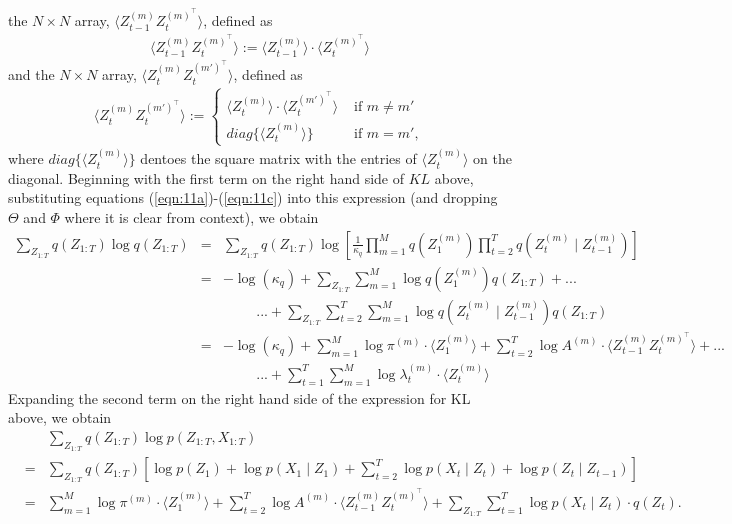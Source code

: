 \documentclass{amsart}
\begin{document}
the $N\times N$ array, $\langle 
Z_{t-1}^{(m)}Z_t^{(m)^\intercal}\rangle$,
defined as  
\begin{eqnarray*}
\langle Z_{t-1}^{(m)}Z_t^{(m)^\intercal}\rangle :=\langle Z_{t-1}^{(m)}\rangle\cdot\langle Z_t^{(m)^\intercal}\rangle 
\end{eqnarray*}
and the $N\times N$ array, $\langle 
Z_{t}^{(m)}Z_t^{(m')^\intercal}\rangle$,
defined as
\begin{eqnarray*}
\langle Z_{t}^{(m)}Z_t^{(m')^\intercal}\rangle := \begin{cases}
\langle Z_t^{(m)}\rangle\cdot\langle Z_t^{(m')^\intercal}\rangle & \text{ 
if }m\neq m'\\
diag\{\langle Z_t^{(m)}\rangle\} & \text{ if }m=m',
\end{cases}
\end{eqnarray*}
where $diag\{\langle Z_t^{(m)}\rangle\}$ dentoes the square matrix with 
the entries of $\langle Z_t^{(m)}\rangle$ on the diagonal.
Beginning with the first term on the right hand side of $KL$ above, substituting equations 
(\ref{eqn:11a})-(\ref{eqn:11c}) into this 
expression (and dropping $\Theta$ and $\Phi$ where it is clear from 
context), we obtain 
\begin{eqnarray*}
\sum_{Z_{1:T}}q(Z_{1:T})\log q(Z_{1:T}) 
& = & \sum_{Z_{1:T}}q(Z_{1:T})\log\left[\frac{1}{\kappa_q}\prod_{m=1}^M 
q(Z_1^{(m)}) \prod_{t=2}^T q(Z_t^{(m)}\mid Z_{t-1}^{(m)})\right]\\
& = & - \log(\kappa_q)+\sum_{Z_{1:T}}\sum_{m=1}^M\log q(Z_1^{(m)})q(Z_{1:T}) + ...\\
&& \hspace{1cm}...+\sum_{Z_{1:T}}\sum_{t=2}^T\sum_{m=1}^M \log q(Z_t^{(m)}\mid Z_{t-1}^{(m)})q(Z_{1:T})
\\
& = & - \log(\kappa_q)+
\sum_{m=1}^M\log 
\pi^{(m)}\cdot \langle Z_1^{(m)}\rangle + \sum_{t=2}^T\log A^{(m)}\cdot \langle 
Z_{t-1}^{(m)}Z_t^{(m)^\intercal}\rangle+...\\
&& \hspace{1cm}...+\sum_{t=1}^T\sum_{m=1}^M\log 
\lambda_{t}^{(m)}\cdot \langle Z_{t}^{(m)}\rangle 
\end{eqnarray*}
Expanding the second term on the right hand side of the expression 
for KL above, we obtain 
\begin{eqnarray*}
&&\sum_{Z_{1:T}}q(Z_{1:T})\log p(Z_{1:T},X_{1:T}) 
\\
& = & \sum_{Z_{1:T}}q(Z_{1:T})\left[\log p(Z_1) + \log p(X_1\mid Z_1) + 
\sum_{t=2}^T\log p(X_t\mid Z_t)+ \log p(Z_t\mid Z_{t-1})\right]
\\
& = & \sum_{m=1}^M \log 
\pi^{(m)}\cdot \langle Z_1^{(m)}\rangle 
+\sum_{t=2}^T\log A^{(m)}\cdot \langle 
Z_{t-1}^{(m)}Z_t^{(m)^\intercal}\rangle +
\sum_{Z_{1:T}}\sum_{t=1}^T\log p(X_t\mid Z_t)\cdot q(Z_t).
\end{eqnarray*}
\end{document}
